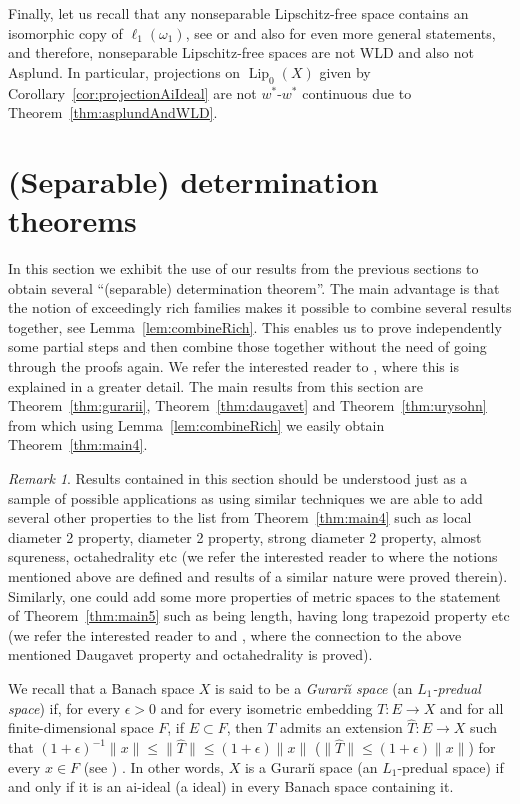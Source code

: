 \documentclass[11pt]{amsart}
\theoremstyle{definition}
\theoremstyle{remark}
\newtheorem{remark}[thm]{Remark}
\def \Lip {\operatorname{Lip}}
\begin{document}
Finally, let us recall that any nonseparable Lipschitz-free space contains an isomorphic copy of $\ell_1(\omega_1)$, see \cite[Theorem 2.1]{Kal11} or \cite[Proposition 3]{HajekNovotny} and also \cite[Theorem 3.9]{AACD20} for even more general statements, and therefore, nonseparable Lipschitz-free spaces are not WLD and also not Asplund. In particular, projections on $\Lip_0(X)$ given by Corollary~\ref{cor:projectionAiIdeal} are not $w^*$-$w^*$ continuous due to Theorem~\ref{thm:asplundAndWLD}.

\section{(Separable) determination theorems}\label{sec:appl}

In this section we exhibit the use of our results from the previous sections to obtain several ``(separable) determination theorem''. The main advantage is that the notion of exceedingly rich families makes it possible to combine several results together, see Lemma~\ref{lem:combineRich}. This enables us to prove independently some partial steps and then combine those together without the need of going through the proofs again. We refer the interested reader to \cite[Introduction]{C18}, where this is explained in a greater detail. The main results from this section are Theorem~\ref{thm:gurarii}, Theorem~\ref{thm:daugavet} and Theorem~\ref{thm:urysohn} from which using Lemma~\ref{lem:combineRich} we easily obtain Theorem~\ref{thm:main4}.

\begin{remark}\label{rem:moreApplications}
Results contained in this section should be understood just as a sample of possible applications as using similar techniques we are able to add several other properties to the list from Theorem~\ref{thm:main4} such as local diameter 2 property, diameter 2 property, strong diameter 2 property, almost squreness, octahedrality etc (we refer the interested reader to \cite{Abr15} where the notions mentioned above are defined and results of a similar nature were proved therein). Similarly, one could add some more properties of metric spaces to the statement of Theorem~\ref{thm:main5} such as being length, having long trapezoid property etc (we refer the interested reader to \cite{GPZ} and \cite{PZ}, where the connection to the above mentioned Daugavet property and octahedrality is proved).
\end{remark}

We recall that a Banach space $X$ is said to be a \emph{Gurari\u{\i} space} (an \emph{$L_1$-predual space}) if, for every $\epsilon > 0$ and for every isometric embedding $T : E \to X$ and for all finite-dimensional space $F$, if $E\subset F$, then $T$ admits an extension $\hat{T}: E \to  X$ such that  $(1+\epsilon)^{-1}\|x\|\leq \|\hat{T}\|\leq (1+\epsilon)\|x\|$ ($\|\hat{T}\|\leq (1+\epsilon)\|x\|$) for every $x\in F$ (see \cite[Proposition 2.7]{Ban18}) .  In other words, $X$ is a Gurari\u{\i} space (an $L_1$-predual space) if and only if it is an ai-ideal (a ideal) in every Banach space containing it.
\end{document}
